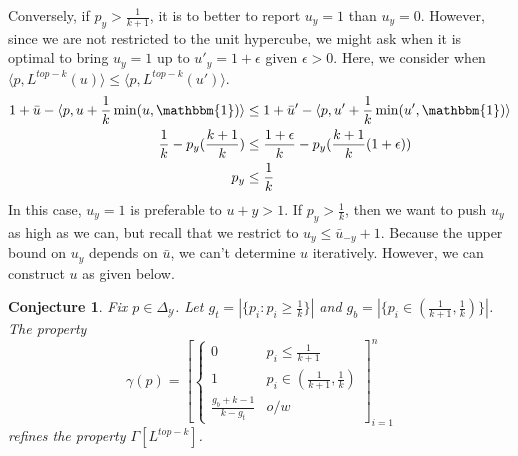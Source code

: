 \documentclass[12pt]{article}
\newcommand{\prop}[1]{\Gamma[#1]}
\newcommand{\ubar}{\bar{u}}
\newcommand{\simplex}{\Delta_\Y}
\newcommand{\Y}{\mathcal{Y}}
\newcommand{\inprod}[2]{\langle #1, #2 \rangle}%
\newcommand{\ones}{\mathbbm{1}}
\newtheorem{conjecture}{Conjecture}
\begin{document}
Conversely, if $p_y > \frac{1}{k+1}$, it is to better to report $u_y = 1$ than $u_y = 0$.
However, since we are not restricted to the unit hypercube, we might ask when it is optimal to bring $u_y = 1$ up to $u'_y = 1 + \epsilon$ given $\epsilon > 0$.
Here, we consider when $\inprod{p}{L^{top-k}(u)} \leq \inprod{p}{L^{top-k}(u')}$.
\begin{align*}
1 + \ubar - \inprod{p}{u + \frac 1 k \min(u, \ones)} &\leq 1 + \ubar' - \inprod{p}{u' + \frac 1 k \min(u', \ones)}\\
\frac{1}{k} - p_y (\frac{k+1}{k}) &\leq \frac{1+\epsilon}{k} - p_y (\frac{k+1}{k}(1 + \epsilon))\\
p_y &\leq \frac{1}{k}
\end{align*}
In this case, $u_y=1$ is preferable to $u+y >1$.
If $p_y > \frac 1 k$, then we want to push $u_y$ as high as we can, but recall that we restrict to $u_y \leq \ubar_{-y} + 1$.
Because the upper bound on $u_y$ depends on $\ubar$, we can't determine $u$ iteratively.
However, we can construct $u$ as given below.
\begin{conjecture}
	Fix $p \in \simplex$.
	Let $g_t = |\{p_i : p_i \geq \frac 1 k\}|$ and $g_b = | \{p_i \in (\frac{1}{k+1}, \frac{1}{k})\}|$.
	The property \[\gamma(p) = 
	\left[
	\begin{cases}
	0 & p_i \leq \frac {1}{k+1}\\
	1 & p_i \in (\frac{1}{k+1}, \frac{1}{k})\\
	\frac{g_b + k-1}{k-g_t} & o/w
	\end{cases}
	\right]_{i=1}^n
	\] refines the property $\prop{L^{top-k}}$.
\end{conjecture}
\end{document}
